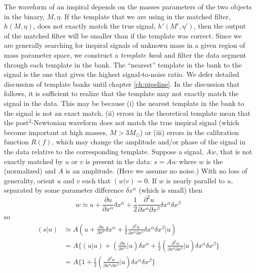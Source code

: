 The waveform of an inspiral depends on the masses parameters of the two
objects in the binary, $M,\eta$. If the template that we are using in the
matched filter, $h(M,\eta)$, does not exactly match the true signal,
$h'(M',\eta')$, then the output of the matched filter will be smaller than if
the template was correct. Since we are generally searching for inspiral
signals of unknown mass in a given region of mass parameter space, we
construct a \emph{template bank} and filter the data segment through each
template in the bank. The ``nearest'' template in the bank to the signal is
the one that gives the highest signal-to-noise ratio.  We defer detailed
discussion of template banks until chapter \ref{ch:pipeline}. In the
discussion that follows, it is sufficient to realize that the template may not
exactly match the signal in the data. This may be because (i) the nearest template
in the bank to the signal is not an exact match, (ii) errors in the theoretical
template mean that the post$^2$-Newtonian waveform does not match the true
inspiral signal (which become important at high masses, $M > 3 M_\odot$) or
(iii) errors in the calibration function $R(f)$, which may change the
amplitude and/or phase of the signal in the data relative to the corresponding
template.  Suppose a signal, $Aw$, that is not exactly matched by $u$ or $v$
is present in the data: $s=Aw$ where $w$ is the (normalized) and $A$ is an
amplitude.  (Here we assume no noise.)  With no loss of generality, orient $u$
and $v$ such that $(w|v)=0$.  If $w$ is nearly parallel to $u$, separated by
some parameter difference $\delta x^\alpha$ (which is small) then
\begin{equation}
  w \simeq u + \frac{\partial u}{\partial x^\alpha}\delta x^\alpha 
  + \frac{1}{2}\frac{\partial^2 u}{\partial x^\alpha \partial x^\beta}\delta x^\alpha\delta x^\beta
\end{equation}
so
\begin{equation}
\begin{split}
  (s|u) &\simeq A\left(u + \frac{\partial u}{\partial x^\alpha}\delta x^\alpha 
  + \frac{1}{2} \frac{\partial^2u}{\partial x^\alpha\partial x^\beta}\delta x^\alpha\delta x^\beta\bigl|u\right)
  \\
  &= A\bigl\{ (u|u) + \left(\frac{\partial u}{\partial x^\alpha}\big|u\right)\delta x^\alpha
  + \frac{1}{2} \left(\frac{\partial^2 u}{\partial x^\alpha \partial x^\beta}\bigl|u\right)\delta x^\alpha\delta x^\beta
  \bigr\}\\
  &= A\bigl\{ 1 +
  \frac{1}{2} \left(\frac{\partial^2 u}{\partial x^\alpha \partial x^\beta}\bigl|u\right)\delta x^\alpha\delta x^\beta
  \bigr\}
\end{split}
\end{equation}
